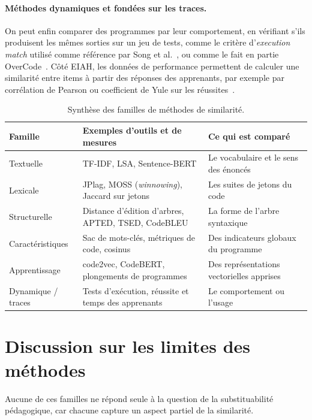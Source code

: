 \paragraph{Méthodes dynamiques et fondées sur les traces.} On peut enfin comparer des programmes par leur comportement, en vérifiant s'ils produisent les mêmes sorties sur un jeu de tests, comme le critère d'\emph{execution match} utilisé comme référence par Song et al.~\cite{song2024tsed}, ou comme le fait en partie OverCode~\cite{glassman2015overcode}. Côté EIAH, les données de performance permettent de calculer une similarité entre items à partir des réponses des apprenants, par exemple par corrélation de Pearson ou coefficient de Yule sur les réussites~\cite{pelanek2020overview}.

\begin{table}[htbp]
  \centering
  \small
  \caption{Synthèse des familles de méthodes de similarité.}
  \label{tab:methodes}
  \begin{tabularx}{\textwidth}{@{}l X X@{}}
    \toprule
    \textbf{Famille} & \textbf{Exemples d'outils et de mesures} & \textbf{Ce qui est comparé} \\
    \midrule
    Textuelle      & TF-IDF, LSA, Sentence-BERT & Le vocabulaire et le sens des énoncés \\
    Lexicale       & JPlag, MOSS (\emph{winnowing}), Jaccard sur jetons & Les suites de jetons du code \\
    Structurelle   & Distance d'édition d'arbres, APTED, TSED, CodeBLEU & La forme de l'arbre syntaxique \\
    Caractéristiques & Sac de mots-clés, métriques de code, cosinus & Des indicateurs globaux du programme \\
    Apprentissage  & code2vec, CodeBERT, plongements de programmes & Des représentations vectorielles apprises \\
    Dynamique / traces & Tests d'exécution, réussite et temps des apprenants & Le comportement ou l'usage \\
    \bottomrule
  \end{tabularx}
\end{table}

\section{Discussion sur les limites des méthodes}
\label{sec:limites}

Aucune de ces familles ne répond seule à la question de la substituabilité pédagogique, car chacune capture un aspect partiel de la similarité.

